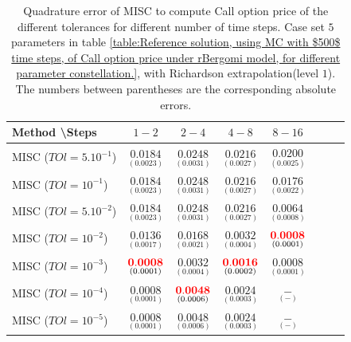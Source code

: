 \documentclass[11pt]{article}
\begin{document}
\begin{table}[h!]
	\centering
	\begin{tabular}{l*{6}{c}r}
		Method \textbackslash  Steps            & $1-2$ & $2-4$ & $4-8$ & $8-16$  \\
		\hline
		MISC ($TOl=5.10^{-1}$)  & $\underset{(0.0023)}{\mathbf{    0.0184
		}}$  & $\underset{( 0.0031)}{\mathbf{ 0.0248}}$  & $\underset{(   0.0027)}{\mathbf{  0.0216}}$  & $\underset{(
	0.0025
)}{\mathbf{  0.0200}}$  \\ 
		MISC ($TOl=10^{-1}$) & $\underset{(0.0023)}{\mathbf{    0.0184
		}}$  & $\underset{( 0.0031)}{\mathbf{ 0.0248}}$   & $\underset{(   0.0027)}{\mathbf{  0.0216}}$ & $\underset{(  0.0022)}{\mathbf{  0.0176}}$  \\ 
		MISC ($TOl=5.10^{-2}$)  &  $\underset{(0.0023)}{\mathbf{    0.0184
		}}$ & $\underset{( 0.0031)}{\mathbf{ 0.0248}}$   & $\underset{(   0.0027)}{\mathbf{  0.0216}}$  & $\underset{(  0.0008)}{\mathbf{  
		0.0064}}$  \\ 
		MISC ($TOl=10^{-2}$)   & $\underset{(    0.0017
			)}{\mathbf{  0.0136}}$  & $\underset{(
			0.0021)}{\mathbf{   0.0168}}$  & $\underset{(0.0004)}{\mathbf{   0.0032
		}}$  & $\underset{(0.0001)}{\mathbf{{\color{red}0.0008}}}$  \\ 
		MISC ($TOl=10^{-3}$)  & $\underset{(0.0001)}{\mathbf{{\color{red}0.0008}}}$  & $\underset{(0.0004)}{\mathbf{  0.0032}}$  & $\underset{(0.0002)}{\mathbf{    {\color{red}0.0016}}}$  &  $\underset{(0.0001)}{\mathbf{0.0008}}$  \\ 
		
		MISC ($TOl=10^{-4}$)  & $\underset{(0.0001)}{\mathbf{0.0008}}$  & $\underset{(0.0006)}{\mathbf{  {\color{red}0.0048}}}$  & $\underset{(0.0003)}{\mathbf{0.0024}}$  & $\underset{(-)}{\mathbf{-}}$  \\

				MISC ($TOl=10^{-5}$)    &  $\underset{(0.0001)}{\mathbf{0.0008}}$ & $\underset{(0.0006)}{\mathbf{  0.0048}}$  & $\underset{(0.0003)}{\mathbf{
						0.0024}}$ & $\underset{(-)}{\mathbf{-}}$  \\
		
		\hline
	\end{tabular}
	\caption{Quadrature error of MISC to compute Call option price of the different tolerances for different number of time steps. Case set $5$ parameters in table \ref{table:Reference solution, using MC with $500$ time steps, of Call option price under rBergomi model, for different parameter constellation.}, with Richardson extrapolation(level $1$). The numbers between parentheses are the corresponding absolute errors.}
	\label{Quadrature error of MISC to compute Call option price of the different tolerances for different number of time steps. Case set $5$ parameters, with Richardson extrapolation(level $1$). The numbers between parentheses are the corresponding absolute errors.}
\end{table}
\end{document}
